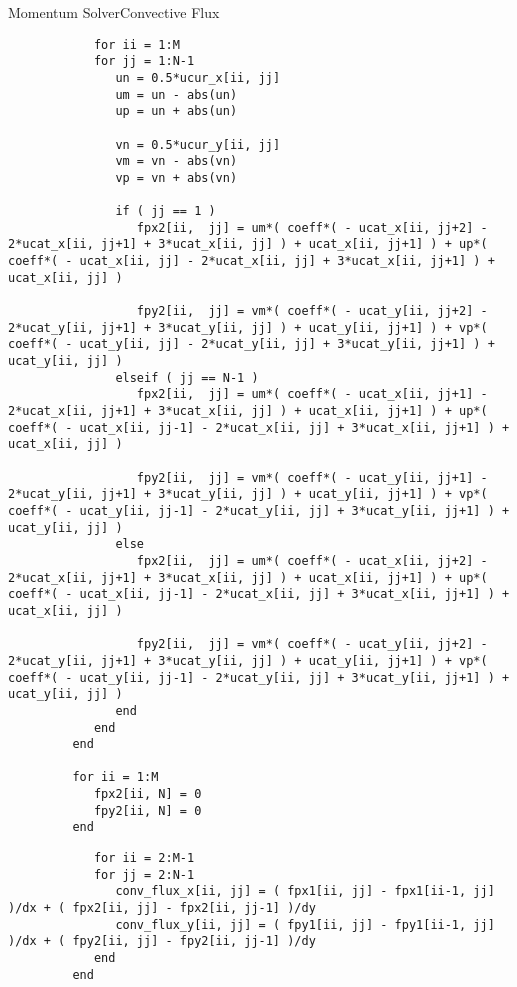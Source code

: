 \documentclass[\string~/GitHub/sthlmNordBeamerTheme/sthlmNordLightDemo.tex]{subfiles}
\begin{document}
\begin{frame}{Momentum Solver}{Convective Flux}
    \framebreak

    \begin{center}
        \begin{verbatim}
            for ii = 1:M
            for jj = 1:N-1
               un = 0.5*ucur_x[ii, jj]
               um = un - abs(un)
               up = un + abs(un)

               vn = 0.5*ucur_y[ii, jj]
               vm = vn - abs(vn)
               vp = vn + abs(vn)

               if ( jj == 1 )
                  fpx2[ii,  jj] = um*( coeff*( - ucat_x[ii, jj+2] - 2*ucat_x[ii, jj+1] + 3*ucat_x[ii, jj] ) + ucat_x[ii, jj+1] ) + up*( coeff*( - ucat_x[ii, jj] - 2*ucat_x[ii, jj] + 3*ucat_x[ii, jj+1] ) + ucat_x[ii, jj] )

                  fpy2[ii,  jj] = vm*( coeff*( - ucat_y[ii, jj+2] - 2*ucat_y[ii, jj+1] + 3*ucat_y[ii, jj] ) + ucat_y[ii, jj+1] ) + vp*( coeff*( - ucat_y[ii, jj] - 2*ucat_y[ii, jj] + 3*ucat_y[ii, jj+1] ) + ucat_y[ii, jj] )
               elseif ( jj == N-1 )
                  fpx2[ii,  jj] = um*( coeff*( - ucat_x[ii, jj+1] - 2*ucat_x[ii, jj+1] + 3*ucat_x[ii, jj] ) + ucat_x[ii, jj+1] ) + up*( coeff*( - ucat_x[ii, jj-1] - 2*ucat_x[ii, jj] + 3*ucat_x[ii, jj+1] ) + ucat_x[ii, jj] )

                  fpy2[ii,  jj] = vm*( coeff*( - ucat_y[ii, jj+1] - 2*ucat_y[ii, jj+1] + 3*ucat_y[ii, jj] ) + ucat_y[ii, jj+1] ) + vp*( coeff*( - ucat_y[ii, jj-1] - 2*ucat_y[ii, jj] + 3*ucat_y[ii, jj+1] ) + ucat_y[ii, jj] )
               else
                  fpx2[ii,  jj] = um*( coeff*( - ucat_x[ii, jj+2] - 2*ucat_x[ii, jj+1] + 3*ucat_x[ii, jj] ) + ucat_x[ii, jj+1] ) + up*( coeff*( - ucat_x[ii, jj-1] - 2*ucat_x[ii, jj] + 3*ucat_x[ii, jj+1] ) + ucat_x[ii, jj] )

                  fpy2[ii,  jj] = vm*( coeff*( - ucat_y[ii, jj+2] - 2*ucat_y[ii, jj+1] + 3*ucat_y[ii, jj] ) + ucat_y[ii, jj+1] ) + vp*( coeff*( - ucat_y[ii, jj-1] - 2*ucat_y[ii, jj] + 3*ucat_y[ii, jj+1] ) + ucat_y[ii, jj] )
               end
            end
         end

         for ii = 1:M
            fpx2[ii, N] = 0
            fpy2[ii, N] = 0
         end
        \end{verbatim}
    \end{center}

    \framebreak

    \begin{center}
        \begin{verbatim}
            for ii = 2:M-1
            for jj = 2:N-1
               conv_flux_x[ii, jj] = ( fpx1[ii, jj] - fpx1[ii-1, jj] )/dx + ( fpx2[ii, jj] - fpx2[ii, jj-1] )/dy
               conv_flux_y[ii, jj] = ( fpy1[ii, jj] - fpy1[ii-1, jj] )/dx + ( fpy2[ii, jj] - fpy2[ii, jj-1] )/dy
            end
         end


\end{verbatim}
\end{center}
\end{frame}
\end{document}
